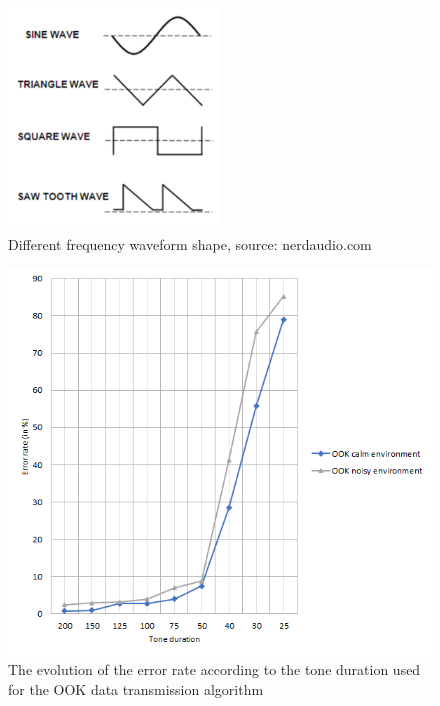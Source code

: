 \documentclass[twocolumn,14pt]{extarticle}
\begin{document}
\begin{figure}[!ht]
\begin{center}
\includegraphics[width=0.5\textwidth]{figure/freqwaveform.png}
\caption{Different frequency waveform shape, source: nerdaudio.com}
\label{appendix:fig:waveformshape}
\end{center}
\end{figure}

\begin{figure}[!ht]
\begin{center}
\includegraphics[width=1\textwidth]{figure/ook-graph.png}
\caption{The evolution of the error rate according to the tone duration used for the OOK data transmission algorithm}
\label{appendix:fig:ookgraph}
\end{center}
\end{figure}
\end{document}
